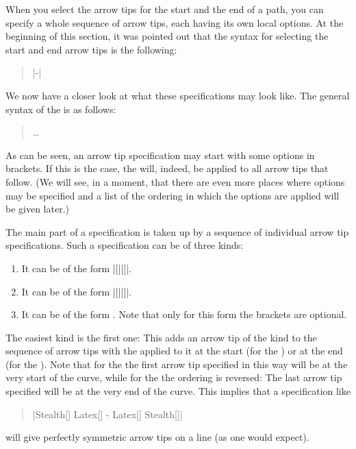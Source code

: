 When you select the arrow tips for the start and the end of a path,
you can specify a whole sequence of arrow tips, each having its own
local options. At the beginning of this section, it was pointed out
that the syntax for selecting the start and end arrow tips is the
following:

\begin{quote}
  |-|
\end{quote}

We now have a closer look at what these specifications may look
like. The general syntax of the  is as
follows: 
\begin{quote}
   
    \dots
\end{quote}
As can be seen, an arrow tip specification may start with some options
in brackets. If this is the case, the 
will, indeed, be applied to all arrow tips that follow. (We will see,
in a moment, that there are even more places where options may be
specified and a list of the ordering in which the options are applied
will be given later.)

The main part of a specification is taken up by a sequence of
individual arrow tip specifications. Such a specification can be of
three kinds:

\begin{enumerate}
\item It can be of the form |[||]|.
\item It can be of the form |[||]|.
\item It can be of the form . Note that only for this form the
  brackets are optional.
\end{enumerate}

The easiest kind is the first one: This adds an arrow tip of the kind
 to the sequence of arrow tips with the
 applied to it at the start (for the ) or at the end (for the ). Note that for the  the 
first arrow tip specified in this way will be at the very start of the
curve, while for the  the ordering is
reversed: The last arrow tip specified will be at the very end of the
curve. This implies that a specification like
\begin{quote}
|Stealth[] Latex[] - Latex[] Stealth[]|
\end{quote}
will give perfectly symmetric arrow tips on a line (as one would
expect).

